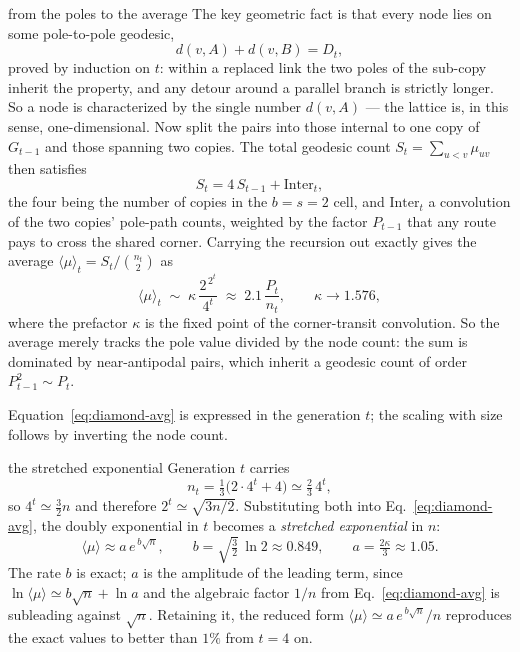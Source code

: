 \begin{calculation}{from the poles to the average}
The key geometric fact is that every node lies on some pole-to-pole geodesic,
\begin{equation}
  d(v,A) + d(v,B) = D_t ,
  \label{eq:diamond-onpath}
\end{equation}
proved by induction on $t$: within a replaced link the two poles of the sub-copy
inherit the property, and any detour around a parallel branch is strictly longer.
So a node is characterized by the single number $d(v,A)$ --- the lattice is, in
this sense, one-dimensional. Now split the pairs into those internal to one copy of
$G_{t-1}$ and those spanning two copies. The total geodesic count
$S_t=\sum_{u<v}\mu_{uv}$ then satisfies
\begin{equation}
  S_t = 4\,S_{t-1} + \mathrm{Inter}_t ,
  \label{eq:diamond-S}
\end{equation}
the four being the number of copies in the $b=s=2$ cell, and $\mathrm{Inter}_t$ a
convolution of the two copies' pole-path counts, weighted by the factor $P_{t-1}$
that any route pays to cross the shared corner. Carrying the recursion out exactly
gives the average $\langle\mu\rangle_t = S_t/\binom{n_t}{2}$ as
\begin{equation}
  \langle\mu\rangle_t \;\sim\; \kappa\,\frac{2^{\,2^{t}}}{4^{t}}
  \;\approx\; 2.1\,\frac{P_t}{n_t},
  \qquad \kappa \to 1.576 ,
  \label{eq:diamond-avg}
\end{equation}
where the prefactor $\kappa$ is the fixed point of the corner-transit convolution.
So the average merely tracks the pole value divided by the node count: the sum is
dominated by near-antipodal pairs, which inherit a geodesic count of order
$P_{t-1}^2\sim P_t$.
\end{calculation}

Equation~\eqref{eq:diamond-avg} is expressed in the generation $t$; the scaling with
size follows by inverting the node count.

\begin{calculation}{the stretched exponential}
Generation $t$ carries
\begin{equation}
  n_t = \tfrac{1}{3}\big(2\cdot4^{t}+4\big) \simeq \tfrac{2}{3}\,4^{t},
  \label{eq:diamond-nt}
\end{equation}
so $4^{t}\simeq\tfrac32 n$ and therefore $2^{t}\simeq\sqrt{3n/2}$. Substituting both
into Eq.~\eqref{eq:diamond-avg}, the doubly exponential in $t$ becomes a
\emph{stretched exponential} in $n$:
\begin{equation}
  \langle\mu\rangle \approx a\,e^{\,b\sqrt{n}},
  \qquad
  b = \sqrt{\tfrac32}\,\ln 2 \approx 0.849,
  \qquad
  a = \tfrac{2\kappa}{3} \approx 1.05 .
  \label{eq:diamond-n}
\end{equation}
The rate $b$ is exact; $a$ is the amplitude of the leading term, since
$\ln\langle\mu\rangle\simeq b\sqrt{n}+\ln a$ and the algebraic factor $1/n$ from
Eq.~\eqref{eq:diamond-avg} is subleading against $\sqrt{n}$. Retaining it, the
reduced form $\langle\mu\rangle\simeq a\,e^{\,b\sqrt{n}}/n$ reproduces the exact
values to better than $1\%$ from $t=4$ on.
\end{calculation}

